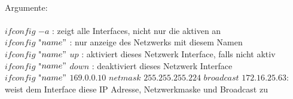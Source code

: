 \documentclass[12pt,a4paper]{report}
\theoremstyle{definition}
\begin{document}
\\
Argumente: \\
\\
$ifconfig$ $-a$ : zeigt alle Interfaces, nicht nur die aktiven an\\
$ifconfig$ "$name"$ : nur anzeige des Netzwerks mit diesem Namen\\
$ifconfig$ "$name"$ $up$ : aktiviert dieses Netzwerk Interface, falls nicht aktiv\\
$ifconfig$ "$name"$ $down$ : deaktiviert dieses Netzwerk Interface\\
$ifconfig$ "$name"$ $169.0.0.10$ $netmask$ $255.255.255.224$ $broadcast$ $172.16.25.63$: weist dem Interface diese IP Adresse, Netzwerkmaske und Broadcast zu\\
\end{document}
